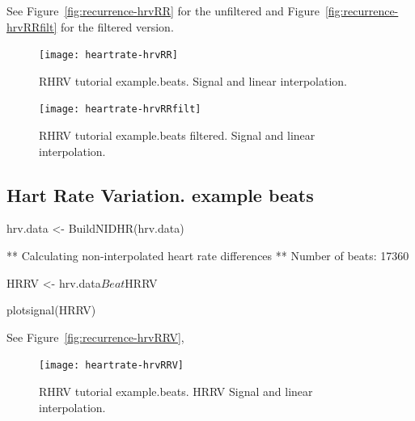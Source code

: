 \documentclass[a4paper, english, utf8]{amsart}
\newcommand{\figref}[1]{Figure\ \vref{#1}}
\begin{document}
See \figref{fig:recurrence-hrvRR} for the unfiltered and \figref{fig:recurrence-hrvRRfilt} for the filtered version.

\begin{figure}[htbp]
\begin{center}
\texttt{[image: heartrate-hrvRR]}
\caption{RHRV tutorial example.beats. Signal and linear interpolation.}
\label{fig:recurrence-hrvRR}
\end{center}
\end{figure}

\begin{figure}[htbp]
\begin{center}
\texttt{[image: heartrate-hrvRRfilt]}
\caption{RHRV tutorial example.beats  filtered. Signal and linear interpolation.}
\label{fig:recurrence-hrvRRfilt}
\end{center}
\end{figure}


\subsection{Hart Rate Variation. example beats}


\begin{Schunk}
\begin{Sinput}
  hrv.data <- BuildNIDHR(hrv.data)
\end{Sinput}
\begin{Soutput}
** Calculating non-interpolated heart rate differences **
   Number of beats: 17360 
\end{Soutput}
\begin{Sinput}
  HRRV <- hrv.data$Beat$HRRV
\end{Sinput}
\end{Schunk}


\begin{Schunk}
\begin{Sinput}
  plotsignal(HRRV)
\end{Sinput}
\end{Schunk}
See \figref{fig:recurrence-hrvRRV},

\begin{figure}[htbp]
\begin{center}
\texttt{[image: heartrate-hrvRRV]}
\caption{RHRV tutorial example.beats. HRRV Signal and linear interpolation.}
\label{fig:recurrence-hrvRRV}
\end{center}
\end{figure}
\end{document}
